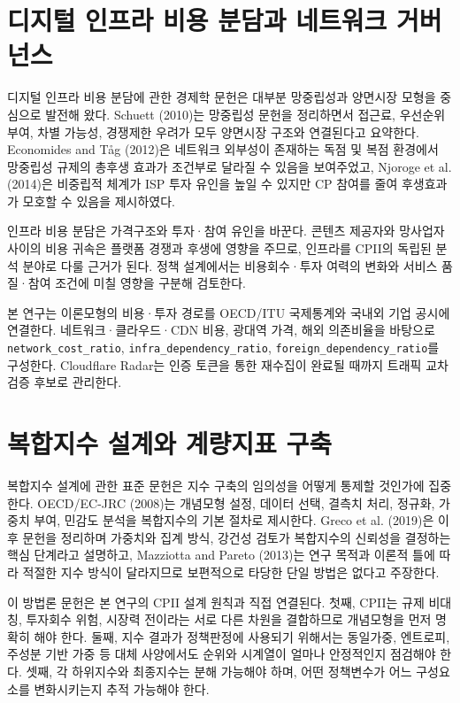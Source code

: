 \documentclass[11pt,a4paper]{report}
\begin{document}
\section{디지털 인프라 비용 분담과 네트워크 거버넌스}
디지털 인프라 비용 분담에 관한 경제학 문헌은 대부분 망중립성과 양면시장 모형을 중심으로 발전해 왔다. Schuett (2010)는 망중립성 문헌을 정리하면서 접근료, 우선순위 부여, 차별 가능성, 경쟁제한 우려가 모두 양면시장 구조와 연결된다고 요약한다. Economides and T\r{a}g (2012)은 네트워크 외부성이 존재하는 독점 및 복점 환경에서 망중립성 규제의 총후생 효과가 조건부로 달라질 수 있음을 보여주었고, Njoroge et al. (2014)은 비중립적 체계가 ISP 투자 유인을 높일 수 있지만 CP 참여를 줄여 후생효과가 모호할 수 있음을 제시하였다.

인프라 비용 분담은 가격구조와 투자·참여 유인을 바꾼다. 콘텐츠 제공자와 망사업자 사이의 비용 귀속은 플랫폼 경쟁과 후생에 영향을 주므로, 인프라를 CPII의 독립된 분석 분야로 다룰 근거가 된다. 정책 설계에서는 비용회수·투자 여력의 변화와 서비스 품질·참여 조건에 미칠 영향을 구분해 검토한다.

본 연구는 이론모형의 비용·투자 경로를 OECD/ITU 국제통계와 국내외 기업 공시에 연결한다. 네트워크·클라우드·CDN 비용, 광대역 가격, 해외 의존비율을 바탕으로 \texttt{network\_cost\_ratio}, \texttt{infra\_dependency\_ratio}, \texttt{foreign\_dependency\_ratio}를 구성한다. Cloudflare Radar는 인증 토큰을 통한 재수집이 완료될 때까지 트래픽 교차검증 후보로 관리한다.

\section{복합지수 설계와 계량지표 구축}
복합지수 설계에 관한 표준 문헌은 지수 구축의 임의성을 어떻게 통제할 것인가에 집중한다. OECD/EC-JRC (2008)는 개념모형 설정, 데이터 선택, 결측치 처리, 정규화, 가중치 부여, 민감도 분석을 복합지수의 기본 절차로 제시한다. Greco et al. (2019)은 이후 문헌을 정리하며 가중치와 집계 방식, 강건성 검토가 복합지수의 신뢰성을 결정하는 핵심 단계라고 설명하고, Mazziotta and Pareto (2013)는 연구 목적과 이론적 틀에 따라 적절한 지수 방식이 달라지므로 보편적으로 타당한 단일 방법은 없다고 주장한다.

이 방법론 문헌은 본 연구의 CPII 설계 원칙과 직접 연결된다. 첫째, CPII는 규제 비대칭, 투자회수 위험, 시장력 전이라는 서로 다른 차원을 결합하므로 개념모형을 먼저 명확히 해야 한다. 둘째, 지수 결과가 정책판정에 사용되기 위해서는 동일가중, 엔트로피, 주성분 기반 가중 등 대체 사양에서도 순위와 시계열이 얼마나 안정적인지 점검해야 한다. 셋째, 각 하위지수와 최종지수는 분해 가능해야 하며, 어떤 정책변수가 어느 구성요소를 변화시키는지 추적 가능해야 한다.
\end{document}

